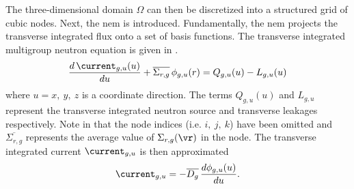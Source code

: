     The three-dimensional domain $\Omega$ can then be discretized into a
    structured grid of cubic nodes. Next, the \gls{nem} is introduced.
    Fundamentally, the \gls{nem} projects the transverse integrated flux onto a 
    set of basis functions. The transverse integrated multigroup neutron
    equation is given in 
    \cite{qe2paper}.
    \begin{equation}
      \label{eq:transverse_multigroup_diffusion}
      \frac{d \, \current_{g,u} (u)}{d u} + \overline{\Sigma_{r,g}} \,
        \phi_{g,u}(r) = Q_{g,u}(u) - L_{g,u}(u)
    \end{equation}
    where $u = x,\ y,\ z$ is a coordinate direction. The terms $Q_{g,u}(u)$ and
    $L_{g,u}$ represent the transverse integrated neutron source and transverse
    leakages respectively. Note in 
    that the node indices (i.e. $i,\ j,\ k$) have been omitted and
    $\overline{\Sigma_{r,g}}$ represents the average value of
    $\Sigma_{r,g}(\vr)$ in the node. The transverse integrated current
    $\current_{g,u}$ is then approximated
    \begin{equation}
      \label{eq:current_approximation}
      \current_{g,u} = - \overline{D_g} \, \frac{d \phi_{g,u}(u)}{du}.
    \end{equation}

